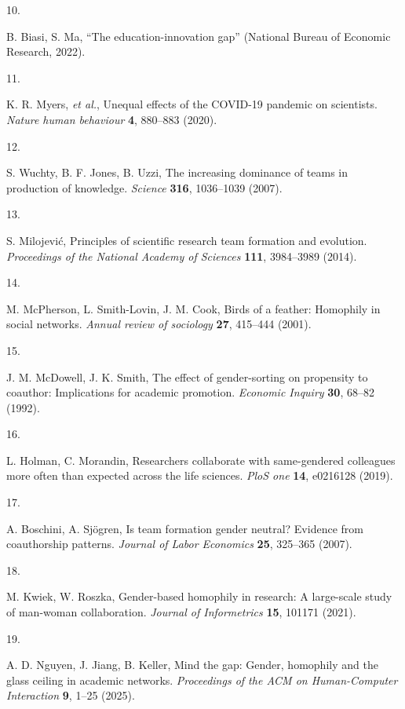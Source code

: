 \documentclass[
  11pt,
]{article}
\newlength{\cslhangindent}
\newlength{\csllabelwidth}
\newenvironment{CSLReferences}[2] %
 {\begin{list}{}{%
  \setlength{\itemindent}{0pt}
  \setlength{\leftmargin}{0pt}
  \setlength{\parsep}{0pt}
  \ifodd #1
   \setlength{\leftmargin}{\cslhangindent}
   \setlength{\itemindent}{-1\cslhangindent}
  \fi
  \setlength{\itemsep}{#2\baselineskip}}}
 {\end{list}}
\newcommand{\CSLLeftMargin}[1]{\parbox[t]{\csllabelwidth}{\strut#1\strut}}
\newcommand{\CSLRightInline}[1]{\parbox[t]{\linewidth - \csllabelwidth}{\strut#1\strut}}
\begin{document}
\begin{CSLReferences}{0}{1}
\CSLLeftMargin{10. }%
\CSLRightInline{B. Biasi, S. Ma, {``The education-innovation gap''} (National Bureau of Economic Research, 2022).}

\CSLLeftMargin{11. }%
\CSLRightInline{K. R. Myers, \emph{et al.}, Unequal effects of the COVID-19 pandemic on scientists. \emph{Nature human behaviour} \textbf{4}, 880--883 (2020).}

\CSLLeftMargin{12. }%
\CSLRightInline{S. Wuchty, B. F. Jones, B. Uzzi, The increasing dominance of teams in production of knowledge. \emph{Science} \textbf{316}, 1036--1039 (2007).}

\CSLLeftMargin{13. }%
\CSLRightInline{S. Milojević, Principles of scientific research team formation and evolution. \emph{Proceedings of the National Academy of Sciences} \textbf{111}, 3984--3989 (2014).}

\CSLLeftMargin{14. }%
\CSLRightInline{M. McPherson, L. Smith-Lovin, J. M. Cook, Birds of a feather: Homophily in social networks. \emph{Annual review of sociology} \textbf{27}, 415--444 (2001).}

\CSLLeftMargin{15. }%
\CSLRightInline{J. M. McDowell, J. K. Smith, The effect of gender-sorting on propensity to coauthor: Implications for academic promotion. \emph{Economic Inquiry} \textbf{30}, 68--82 (1992).}

\CSLLeftMargin{16. }%
\CSLRightInline{L. Holman, C. Morandin, Researchers collaborate with same-gendered colleagues more often than expected across the life sciences. \emph{PloS one} \textbf{14}, e0216128 (2019).}

\CSLLeftMargin{17. }%
\CSLRightInline{A. Boschini, A. Sjögren, Is team formation gender neutral? Evidence from coauthorship patterns. \emph{Journal of Labor Economics} \textbf{25}, 325--365 (2007).}

\CSLLeftMargin{18. }%
\CSLRightInline{M. Kwiek, W. Roszka, Gender-based homophily in research: A large-scale study of man-woman collaboration. \emph{Journal of Informetrics} \textbf{15}, 101171 (2021).}

\CSLLeftMargin{19. }%
\CSLRightInline{A. D. Nguyen, J. Jiang, B. Keller, Mind the gap: Gender, homophily and the glass ceiling in academic networks. \emph{Proceedings of the ACM on Human-Computer Interaction} \textbf{9}, 1--25 (2025).}


\end{CSLReferences}
\end{document}
